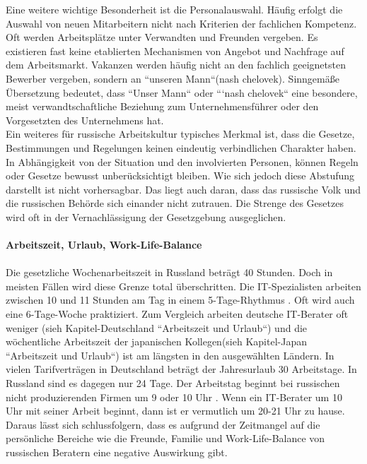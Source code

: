 	 Eine weitere wichtige Besonderheit ist die Personalauswahl. Häufig erfolgt die Auswahl von neuen Mitarbeitern nicht nach Kriterien der fachlichen Kompetenz. Oft werden Arbeitsplätze unter Verwandten und 
	 Freunden vergeben. Es existieren fast keine etablierten Mechanismen von Angebot und Nachfrage auf dem Arbeitsmarkt. Vakanzen werden häufig nicht an den fachlich geeignetsten Bewerber vergeben, sondern an ``unseren Mann``(nash chelovek). Sinngemäße Übersetzung bedeutet, dass ``Unser Mann`` oder ```nash chelovek`` eine besondere, meist verwandtschaftliche Beziehung zum Unternehmensführer oder den Vorgesetzten des Unternehmens hat.\\
	 Ein weiteres für russische Arbeitskultur typisches Merkmal ist, dass die Gesetze, Bestimmungen und Regelungen keinen eindeutig verbindlichen Charakter haben. In Abhängigkeit von der Situation und den involvierten Personen, können Regeln oder Gesetze bewusst unberücksichtigt bleiben. Wie sich jedoch diese Abstufung darstellt ist nicht vorhersagbar. Das liegt auch daran, dass das russische Volk und die russischen Behörde sich einander nicht zutrauen. Die Strenge des Gesetzes wird oft in der Vernachlässigung der Gesetzgebung ausgeglichen. \cite{ProzessbeglBerRU}\\ \\ 
	 \textbf{Arbeitszeit, Urlaub, Work-Life-Balance}\\ %
	 \\
	 Die gesetzliche Wochenarbeitszeit in Russland beträgt 40 Stunden. Doch in meisten Fällen wird diese Grenze total überschritten. Die IT-Spezialisten arbeiten zwischen 10 und 11 Stunden am Tag in einem 5-Tage-Rhythmus \cite{ArbZeitRU}. 
	  Oft wird auch eine 6-Tage-Woche praktiziert. Zum Vergleich arbeiten deutsche IT-Berater oft weniger (sieh Kapitel-Deutschland ``Arbeitszeit und Urlaub``) und die wöchentliche Arbeitszeit der japanischen Kollegen(sieh Kapitel-Japan ``Arbeitszeit und Urlaub``) ist am längsten in den ausgewählten Ländern. 
	 In vielen Tarifverträgen in Deutschland beträgt der Jahresurlaub 30 Arbeitstage. In Russland sind es dagegen nur 24 Tage. Der Arbeitstag beginnt bei russischen nicht produzierenden Firmen um 9 oder 10 Uhr \cite{ArbZeitRU}. Wenn ein IT-Berater um 10 Uhr mit seiner Arbeit beginnt, dann ist er vermutlich um 20-21 Uhr zu hause. Daraus lässt sich schlussfolgern, dass es aufgrund der Zeitmangel auf die persönliche Bereiche wie die Freunde, Familie und Work-Life-Balance von russischen Beratern eine negative Auswirkung gibt.   \\ \\
